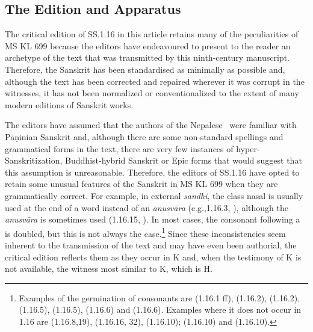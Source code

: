 \subsection{The Edition and Apparatus}

The critical edition of SS.1.16 in this article retains many of the peculiarities of MS 
KL 699 because the editors have endeavoured to present to the reader an 
archetype of the text that was transmitted by this ninth-century manuscript. 
Therefore, the Sanskrit has been standardised as minimally as possible and, 
although the text has been corrected and repaired wherever it was corrupt in the 
witnesses, it has not been normalized or conventionalized to the extent of many 
modern editions of Sanskrit works. 

The editors have assumed that the authors of the Nepalese \SS\ were familiar 
with Pāṇinian Sanskrit and, although there are some non-standard spellings and 
grammatical forms in the text, there are very few instances of 
hyper-Sanskritization, Buddhist-hybrid Sanskrit or Epic forms that would suggest 
that this assumption is unreasonable. Therefore, the editors of SS.1.16 have 
opted to retain some unusual features of the Sanskrit in MS KL 699 when they are 
grammatically correct. For example, in external \emph{sandhi}, the class nasal is 
usually used at the end of a word instead of an \emph{anusvāra} (e.g.,1.16.3, 
), although the \emph{anusvāra} is sometimes used 
(1.16.15, ). In most cases, the consonant following a 
 is doubled, but this is not always the case.\footnote{Examples of 
the germination of consonants are  (1.16.1 ff),  
(1.16.2),  (1.16.2),  (1.16.5),  (1.16.5),  (1.16.6) and  (1.16.6). 
Examples where it does not occur in 1.16 are   (1.16.8,19), 
 (1.16.16, 32),  (1.16.10);  (1.16.10) and  (1.16.10).} Since these 
inconsistencies seem inherent to the transmission of the text and may have even 
been authorial, the critical edition reflects them as they occur in K and, when the 
testimony of K is not available, the witness most similar to K, which is H.




